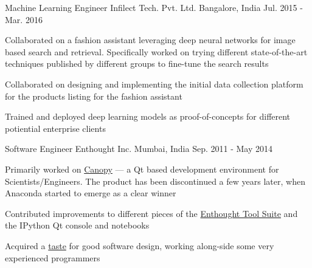 \begin{cventries}
  \cventry
    {Machine Learning Engineer} %
    {Infilect Tech. Pvt. Ltd. } %
    {Bangalore, India} %
    {Jul. 2015 - Mar. 2016} %
    {
      \begin{cvitems} %
        \item{Collaborated on a fashion assistant leveraging deep neural networks for image based search and retrieval. Specifically worked on trying different state-of-the-art techniques published by different groups to fine-tune the search results}
        \item{Collaborated on designing and implementing the initial data collection platform for the products listing for the fashion assistant}
        \item{Trained and deployed deep learning models as proof-of-concepts for different potiential enterprise clients}
      \end{cvitems}
    }

  \cventry
    {Software Engineer} %
    {Enthought Inc. } %
    {Mumbai, India} %
    {Sep. 2011 - May 2014} %
    {
      \begin{cvitems} %
        \item {Primarily worked on \href{https://web.archive.org/web/20170621202502/https://www.enthought.com/products/canopy/}{Canopy} --- a Qt based development environment for Scientists/Engineers. The product has been discontinued a few years later, when Anaconda started to emerge as a clear winner}
        \item {Contributed improvements to different pieces of the \href{https://docs.enthought.com/ets/}{Enthought Tool Suite} and the IPython Qt console and notebooks}
        \item {Acquired a \href{https://rawgit.com/punchagan/340e1350fdfc766c6599/raw/ca1f5fe9bfc1cc503cd8a524e350bd29e8f5f33d/month-with-martin.html}{taste} for good software design, working along-side some very experienced programmers}
      \end{cvitems}
    }


\end{cventries}
